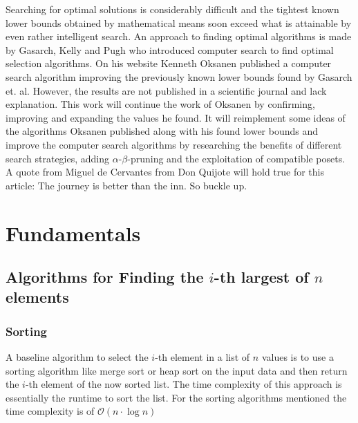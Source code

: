 \documentclass[10pt,journal,compsoc]{IEEEtran}
\begin{document}
Searching for optimal solutions is considerably difficult and the tightest known lower bounds obtained by mathematical means soon exceed what is attainable by even rather intelligent search.
An approach to finding optimal algorithms is made by Gasarch, Kelly and Pugh \cite{Gasarch1996} who introduced computer search to find optimal selection algorithms.
On his website Kenneth Oksanen \cite{Oksanen} published a computer search algorithm improving the previously known lower bounds found by Gasarch et. al.
However, the results are not published in a scientific journal and lack explanation.
This work will continue the work of Oksanen \cite{Oksanen} by confirming, improving and expanding the values he found.
It will reimplement some ideas of the algorithms Oksanen published along with his found lower bounds and improve the computer search algorithms by researching the benefits of different search strategies, adding $\alpha$-$\beta$-pruning and the exploitation of compatible posets.
A quote from Miguel de Cervantes from Don Quijote will hold true for this article: The journey is better than the inn.
So buckle up.

\section{Fundamentals}
\subsection{Algorithms for Finding the $i$-th largest of $n$ elements}
\subsubsection{Sorting}
A baseline algorithm to select the $i$-th element in a list of $n$ values is to use a sorting algorithm like merge sort or heap sort on the input data and then return the $i$-th element of the now sorted list.
The time complexity of this approach is essentially the runtime to sort the list.
For the sorting algorithms mentioned the time complexity is of $\mathcal{O}(n \cdot \log n)$
\end{document}
